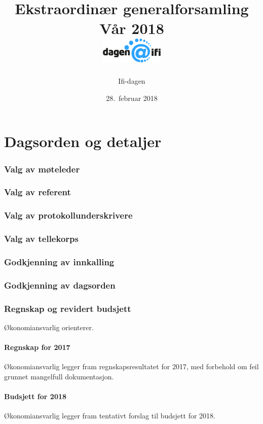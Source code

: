 \documentclass[10pt,norsk,a4paper]{article}
\title{Ekstraordinær generalforsamling \\
	Vår 2018\\[3cm]
	\includegraphics[width=3cm,trim=0 4cm 0 0]{../res/logo.png}\\}
\date{28.\ februar 2018}
\author{Ifi-dagen}
\begin{document}
\maketitle{}
\newpage
\part{Dagsorden og detaljer}
\tableofcontents{}
\newpage


\section{Valg av møteleder}

\section{Valg av referent}

\section{Valg av protokollunderskrivere}

\section{Valg av tellekorps}

\section{Godkjenning av innkalling}

\section{Godkjenning av dagsorden}

\section{Regnskap og revidert budsjett}
Økonomiansvarlig orienterer.

\subsection{Regnskap for 2017}
Økonomiansvarlig legger fram regnskapsresultatet for 2017, med forbehold om feil grunnet mangelfull dokumentasjon.

\subsection{Budsjett for 2018}
Økonomiansvarlig legger fram tentativt forslag til budsjett for 2018.
\end{document}
